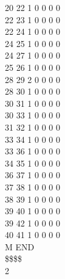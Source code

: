 \documentclass[11pt,titlepage,dvipdfmx,twoside]{article}
\begin{document}
\begin{oframed}
{ 20 22  1  0  0  0  0                                                   \\
 22 23  1  0  0  0  0                                                   \\
 22 24  1  0  0  0  0                                                   \\
 24 25  1  0  0  0  0                                                   \\
 24 27  1  0  0  0  0                                                   \\
 25 26  1  0  0  0  0                                                   \\
 28 29  2  0  0  0  0                                                   \\
 28 30  1  0  0  0  0                                                   \\
 30 31  1  0  0  0  0                                                   \\
 30 33  1  0  0  0  0                                                   \\
 31 32  1  0  0  0  0                                                   \\
 33 34  1  0  0  0  0                                                   \\
 33 36  1  0  0  0  0                                                   \\
 34 35  1  0  0  0  0                                                   \\
 36 37  1  0  0  0  0                                                   \\
 37 38  1  0  0  0  0                                                   \\
 38 39  1  0  0  0  0                                                   \\
 39 40  1  0  0  0  0                                                   \\
 39 42  1  0  0  0  0                                                   \\
 40 41  1  0  0  0  0                                                   \\
M  END                                                                  \\
\$\$\$\$                                                                \\
2                                                                       \\
}
\end{oframed}
\end{document}
